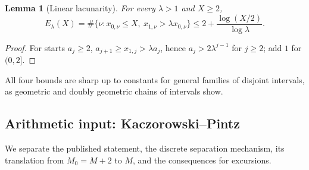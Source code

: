 \documentclass[11pt,reqno]{amsart}
\numberwithin{equation}{section}
\theoremstyle{plain}
\newtheorem{lemma}[theorem]{Lemma}
\theoremstyle{definition}
\theoremstyle{remark}
\begin{document}
\begin{lemma}[Linear lacunarity]
\label{lem:linear-lacunary}
For every $\lambda>1$ and $X\ge2$,
\begin{equation}
\label{eq:linear-lacunary-count}
E_\lambda(X)=\#\{\nu:x_{0,\nu}\le X,\ x_{1,\nu}>\lambda x_{0,\nu}\}
\le2+\frac{\log(X/2)}{\log\lambda}.
\end{equation}
\end{lemma}

\begin{proof}
For starts $a_j\ge2$, $a_{j+1}\ge x_{1,j}>\lambda a_j$, hence
$a_j>2\lambda^{j-1}$ for $j\ge2$; add $1$ for $(0,2]$.
\end{proof}

All four bounds are sharp up to constants for general families of disjoint
intervals, as geometric and doubly geometric chains of intervals show.

\subsection{Arithmetic input: Kaczorowski--Pintz}

We separate the published statement, the discrete separation mechanism, its
translation from $M_0=M+2$ to $M$, and the consequences for excursions.
\end{document}
